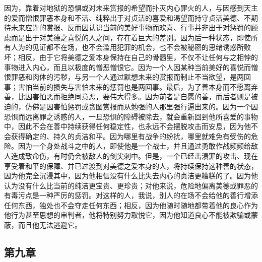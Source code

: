 \par

因为，靠着对地狱的恐惧或对未来赏报的希望而扑灭内心罪火的人，与因感到天主的爱而憎恨罪恶本身和不洁、纯粹出于对贞洁的喜爱和渴望而持守贞洁美德、不期待未来应许的赏报、反而因认识当前的美好事物而欢喜、行事并非出于对惩罚的顾虑而是出于对美德之喜悦的人之间，存在着巨大的差别。因为后一种状态，即使所有人为的见证都不在场，也不会滥用犯罪的机会，也不会被秘密的思绪诱惑所败坏；相反，由于它将美德之爱本身保持在自己的骨髓里，不仅不让任何与之相悖的事物进入内心，而且以极度的憎恶憎恨它。因为一个人因某种当前美好的喜悦而憎恨罪恶和肉体的污秽，与另一个人通过默想未来的赏报而制止不当欲望，是两回事；害怕当前的损失与害怕未来的惩罚也是两回事。最后，为了善本身而不愿离弃善，比因害怕恶而拒绝同意恶，要伟大得多。因为前者是自愿的善，而后者则是被迫的，仿佛是因害怕惩罚或贪图赏报而从勉强的人那里强行逼出来的。因为一个因恐惧而远离罪之诱惑的人，一旦恐惧的障碍被除去，就会重新回到他所喜爱的事物中，因此不会在善中持续获得任何稳定性，也永远不会摆脱攻击而安息，因为他不会获得确定的、持久的贞洁和平。因为哪里有战争的纷扰，哪里就难免有受伤的危险。因为一个身处战斗之中的人，即使他是一个战士，并且通过勇敢作战频频给敌人造成致命伤，有时仍会被敌人的剑尖刺中。但是，一个已经击溃罪的攻击、现在享受着和平的保障、并已过渡到对美德之爱本身的人，将持续保持这种善的状态，因为他完全沉浸其中，因为他相信没有什么比失去内心的贞洁更糟糕的了。因为他认为没有什么比当前的纯洁更宝贵、更珍贵；对他来说，危险地偏离美德或罪恶的有毒污点是一种严厉的惩罚。对这样的人，我说，别人的在场不会给他的善行增添任何东西，独处也不会夺走任何东西；相反，因为他随时随地都带着他的良心作为他行为甚至思想的审判者，他将特别努力取悦它，因为他知道良心不能被欺骗或蒙蔽，而且他无法逃避它。\par


\subsection{第九章}

\par

